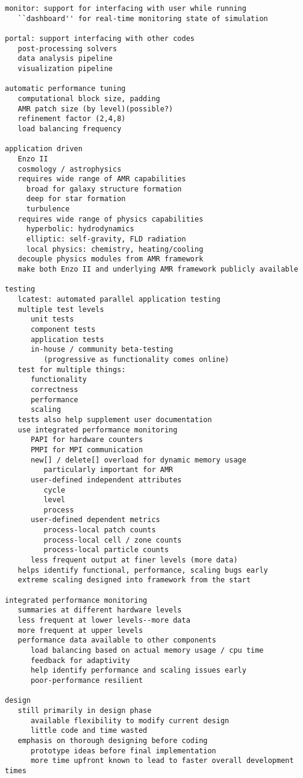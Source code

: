 \documentclass[14pt,letter]{article}
\begin{document}
\begin{verbatim}
monitor: support for interfacing with user while running
   ``dashboard'' for real-time monitoring state of simulation
   
portal: support interfacing with other codes
   post-processing solvers
   data analysis pipeline
   visualization pipeline

automatic performance tuning
   computational block size, padding
   AMR patch size (by level)(possible?)
   refinement factor (2,4,8)
   load balancing frequency

application driven
   Enzo II
   cosmology / astrophysics
   requires wide range of AMR capabilities
     broad for galaxy structure formation
     deep for star formation
     turbulence
   requires wide range of physics capabilities
     hyperbolic: hydrodynamics
     elliptic: self-gravity, FLD radiation
     local physics: chemistry, heating/cooling
   decouple physics modules from AMR framework
   make both Enzo II and underlying AMR framework publicly available

testing
   lcatest: automated parallel application testing
   multiple test levels
      unit tests
      component tests
      application tests
      in-house / community beta-testing
         (progressive as functionality comes online)
   test for multiple things:
      functionality
      correctness
      performance
      scaling
   tests also help supplement user documentation
   use integrated performance monitoring
      PAPI for hardware counters
      PMPI for MPI communication
      new[] / delete[] overload for dynamic memory usage
         particularly important for AMR
      user-defined independent attributes
         cycle
         level
         process
      user-defined dependent metrics
         process-local patch counts
         process-local cell / zone counts
         process-local particle counts
      less frequent output at finer levels (more data)
   helps identify functional, performance, scaling bugs early
   extreme scaling designed into framework from the start

integrated performance monitoring
   summaries at different hardware levels
   less frequent at lower levels--more data
   more frequent at upper levels
   performance data available to other components
      load balancing based on actual memory usage / cpu time
      feedback for adaptivity
      help identify performance and scaling issues early
      poor-performance resilient

design
   still primarily in design phase
      available flexibility to modify current design
      little code and time wasted
   emphasis on thorough designing before coding
      prototype ideas before final implementation
      more time upfront known to lead to faster overall development times


\end{verbatim}
\end{document}
